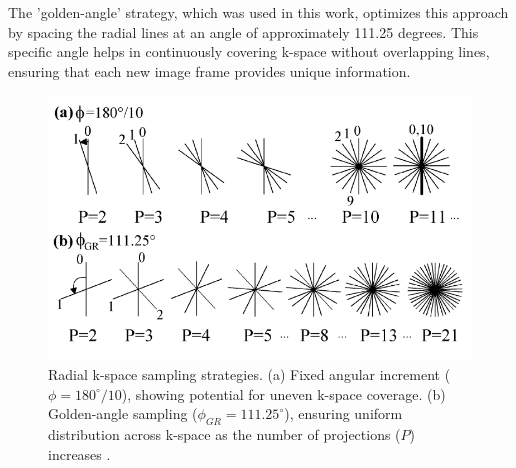 \documentclass{micro-econ-thesis}
\begin{document}
 The 'golden-angle' strategy, which was used in this work, optimizes this approach by spacing the radial lines at an angle of approximately 111.25 degrees. This specific angle helps in continuously covering k-space without overlapping lines, ensuring that each new image frame provides unique information. 
 
\begin{figure}[H]
	\centering
	\includegraphics[width=0.7\linewidth]{golden_angle_figure}
	\caption{Radial k-space sampling strategies. (a) Fixed angular increment ($\phi = 180^\circ / 10$), showing potential for uneven k-space coverage. (b) Golden-angle sampling ($\phi_{GR} = 111.25^\circ$), ensuring uniform distribution across k-space as the number of projections ($P$) increases \parencite{winkelmann_optimal_2007}.}
	\label{fig:goldenanglefigure}
\end{figure}
\end{document}
